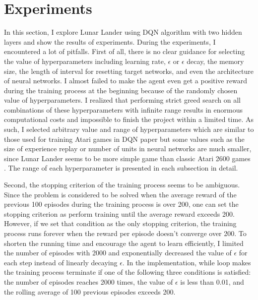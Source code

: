 \documentclass{article}
\begin{document}
\section{Experiments}
In this section, I explore Lunar Lander using DQN algorithm with two hidden layers and show the results of experiments. During the experiments, I encountered a lot of pitfalls. First of all, there is no clear guidance for selecting the value of hyperparameters including learning rate, $\epsilon$ or $\epsilon$ decay, the memory size, the length of interval for resetting target networks, and even the architecture of neural networks. I almost failed to make the agent even get a positive reward during the training process at the beginning because of the randomly chosen value of hyperparameters. I realized that performing strict greed search on all combinations of these hyperparameters with infinite range results in enormous computational costs and impossible to finish the project within a limited time. As such, I selected arbitrary value and range of hyperparameters which are similar to those used for training Atari games in DQN paper but some values such as the size of experience replay or number of units in neural networks are much smaller, since Lunar Lander seems to be more simple game than classic Atari 2600 games \cite{mnih2015human}. The range of each hyperparameter is presented in each subsection in detail. 

Second, the stopping criterion of the training process seems to be ambiguous. Since the problem is considered to be solved when the average reward of the previous 100 episodes during the training process is over 200, one can set the stopping criterion as perform training until the average reward exceeds 200. However, if we set that condition as the only stopping criterion, the training process runs forever when the reward per episode doesn't converge over 200. To shorten the running time and encourage the agent to learn efficiently, I limited the number of episodes with 2000 and exponentially decreased the value of $\epsilon$ for each step instead of linearly decaying $\epsilon$. In the implementation, while loop makes the training process terminate if one of the following three conditions is satisfied: the number of episodes reaches 2000 times, the value of $\epsilon$ is less than 0.01, and the rolling average of 100 previous episodes exceeds 200. 
\end{document}
